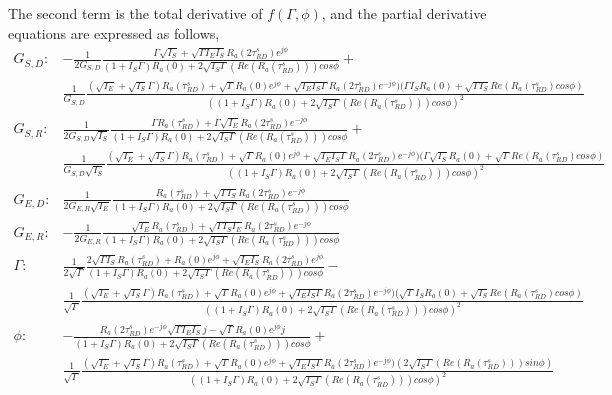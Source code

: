 The second term is the total derivative of $f(\Gamma, \phi)$, and the partial derivative equations are expressed as follows,
\begin{align}
G_{S,D} :& -\frac{1}{2 G_{S,D}}
\frac{\Gamma \sqrt{I_S} + \sqrt{\Gamma I_E I_S } R_a(2\tau^s _{RD}) e^{j  \phi}}
{(1+I_S \Gamma)R_a(0)+
2 \sqrt{I_S\Gamma}(Re(R_a(\tau^s_{RD})) )cos\phi} +  \nonumber \\
&\frac{1}{ G_{S,D}}\frac
{(\sqrt{I_E}+ \sqrt{I_S} \Gamma)R_a(\tau^s_{RD})+
\sqrt{\Gamma}R_a(0)e^{j\phi}+
\sqrt{I_E I_S\Gamma}R_a(2\tau^s_{RD})e^{-j \phi } )
(\Gamma I_S R_a(0) + \sqrt{\Gamma I_S} Re(R_a(\tau^s_{RD}) cos\phi)
}
{((1+I_S \Gamma)R_a(0)+
2 \sqrt{I_S\Gamma}(Re(R_a(\tau^s_{RD})) )cos\phi)^2
}     \\ 
G_{S,R} :& \frac{1}{2 G_{S,D} \sqrt{I_S}} 
\frac{\Gamma R_a(\tau^s_{RD}) + \Gamma \sqrt{I_E} R_a(2\tau^s_{RD}) e^{-j \phi} }
{(1+I_S \Gamma)R_a(0)+
2 \sqrt{I_S\Gamma}(Re(R_a(\tau^s_{RD})) )cos\phi} +  \nonumber \\
&\frac{1}{G_{S,D} \sqrt{I_S}}\frac
{(\sqrt{I_E}+ \sqrt{I_S} \Gamma)R_a(\tau^s_{RD})+
\sqrt{\Gamma}R_a(0)e^{j\phi}+
\sqrt{I_E I_S\Gamma}R_a(2\tau^s_{RD})e^{-j \phi } )
(\Gamma \sqrt{I_S} R_a(0) + \sqrt{\Gamma} Re(R_a(\tau^s_{RD}) cos\phi)
}
{((1+I_S \Gamma)R_a(0)+
2 \sqrt{I_S\Gamma}(Re(R_a(\tau^s_{RD})) )cos\phi)^2
}    \\
G_{E,D} :& 
\frac{1}{2 G_{E,R} \sqrt{I_E}}
\frac{R_a(\tau^s_{RD}) + \sqrt{\Gamma I_S} R_a(2 \tau^s_{RD}) e^{-j \phi}}
{(1+I_S \Gamma)R_a(0)+
2 \sqrt{I_S\Gamma}(Re(R_a(\tau^s_{RD})) )cos\phi
}  \\
G_{E,R} :& 
-\frac{1}{2 G_{E,R}}
\frac{ \sqrt{I_E} R_a(\tau^s_{RD}) + \sqrt{\Gamma I_S I_E} R_a(2 \tau^s_{RD}) e^{-j \phi}}
{(1+I_S \Gamma)R_a(0)+
2 \sqrt{I_S\Gamma}(Re(R_a(\tau^s_{RD})) )cos\phi
}  \\
\Gamma :& \frac{1}{2 \sqrt{\Gamma}}
\frac{2 \sqrt{\Gamma I_S }R_a(\tau^s_{RD}) + R_a(0) e^{j\phi} +\sqrt{ I_E I_S } R_a(2\tau^s _{RD}) e^{j  \phi}}
{(1+I_S \Gamma)R_a(0)+
2 \sqrt{I_S\Gamma}(Re(R_a(\tau^s_{RD})) )cos\phi} -  \nonumber \\
& \frac{1}{ \sqrt{\Gamma}}
\frac
{(\sqrt{I_E}+ \sqrt{I_S} \Gamma)R_a(\tau^s_{RD})+
\sqrt{\Gamma}R_a(0)e^{j\phi}+
\sqrt{I_E I_S\Gamma}R_a(2\tau^s_{RD})e^{-j \phi } )
(\sqrt{\Gamma} I_S R_a(0) + \sqrt{ I_S} Re(R_a(\tau^s_{RD}) cos\phi)
}
{((1+I_S \Gamma)R_a(0)+
2 \sqrt{I_S\Gamma}(Re(R_a(\tau^s_{RD})) )cos\phi)^2
}  \\
\phi :& 
-\frac{R_a(2\tau^s_{RD}) e^{-j\phi}\sqrt{\Gamma I_E I_S} j - \sqrt{\Gamma}R_a(0)e^{j\phi}j }
{(1+I_S \Gamma)R_a(0)+
2 \sqrt{I_S\Gamma}(Re(R_a(\tau^s_{RD})) )cos\phi} + \nonumber \\
& \frac{1}{ \sqrt{\Gamma}}
\frac
{(\sqrt{I_E}+ \sqrt{I_S} \Gamma)R_a(\tau^s_{RD})+
\sqrt{\Gamma}R_a(0)e^{j\phi}+
\sqrt{I_E I_S\Gamma}R_a(2\tau^s_{RD})e^{-j \phi } )
(2 \sqrt{I_S\Gamma}(Re(R_a(\tau^s_{RD})) )sin\phi)
}
{((1+I_S \Gamma)R_a(0)+
2 \sqrt{I_S\Gamma}(Re(R_a(\tau^s_{RD})) )cos\phi)^2
} 
\end{align}
